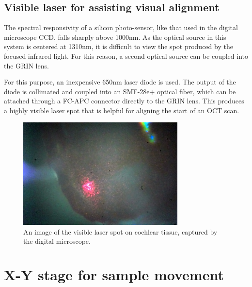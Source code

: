 \subsection{Visible laser for assisting visual alignment}


The spectral responsivity of a silicon photo-sensor, like that used in the digital microscope CCD, falls sharply above 1000nm. As the optical source in this system is centered at 1310nm, it is difficult to view the spot produced by the focused infrared light. For this reason, a second optical source can be coupled into the GRIN lens.

For this purpose, an inexpensive 650nm laser diode is used. The output of the diode is collimated and coupled into an SMF-28e+ optical fiber, which can be attached through a FC-APC connector directly to the GRIN lens. This produces a highly visible laser spot that is helpful for aligning the start of an OCT scan.

\begin{figure}[h!]
\centering
\includegraphics[width=0.75\textwidth]{Images/System/alignment_laser.jpg}
\caption[An image of the visible laser spot on cochlear tissue.]{An image of the visible laser spot on cochlear tissue, captured by the digital microscope.}
\end{figure}


\section{X-Y stage for sample movement}

